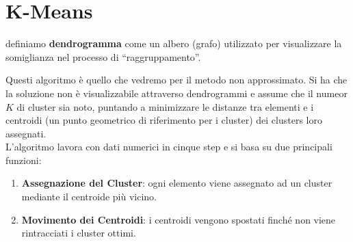 \section{K-Means}
\begin{definizione}
  definiamo \textbf{dendrogramma} come un albero (grafo) utilizzato per
  visualizzare la somiglianza nel processo di ``raggruppamento''.
  
\end{definizione}
Questi algoritmo è quello che vedremo per il metodo non approssimato. Si ha che
la  soluzione non è visualizzabile attraverso dendrogrammi e assume che il
numeor $K$ di cluster sia noto, puntando a minimizzare le distanze tra elementi
e i centroidi (un punto geometrico di riferimento per i cluster) dei clusters
loro assegnati.\\
L'algoritmo lavora con dati numerici in cinque step e si basa su due principali funzioni:
\begin{enumerate}
    \item \textbf{Assegnazione del Cluster}: ogni elemento viene assegnato ad un cluster mediante il centroide più vicino.
    \item \textbf{Movimento dei Centroidi}: i centroidi vengono spostati finché non viene rintracciati i cluster ottimi.
\end{enumerate}
